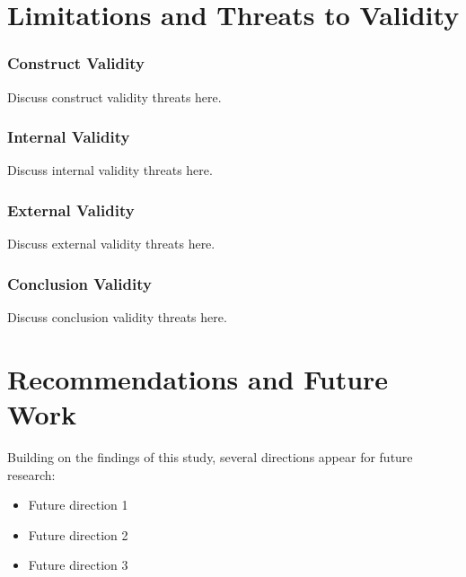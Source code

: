 \section{Limitations and Threats to Validity}


\subsubsection{Construct Validity}
Discuss construct validity threats here.

\subsubsection{Internal Validity}
Discuss internal validity threats here.

\subsubsection{External Validity}
Discuss external validity threats here.

\subsubsection{Conclusion Validity}
Discuss conclusion validity threats here.

\section{Recommendations and Future Work}


Building on the findings of this study, several directions appear for future research:
\begin{itemize}
    \item Future direction 1
    \item Future direction 2
    \item Future direction 3
\end{itemize}
